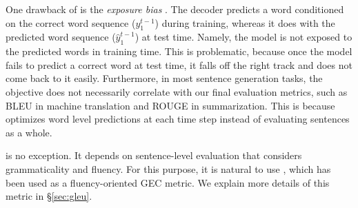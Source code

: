 One drawback of \mle is the {\em exposure bias} \cite{2015arXiv151106732R}. 
The decoder predicts a word conditioned on the correct word sequence ($y_{1}^{t-1}$) during training, whereas it does with the predicted word sequence ($\hat{y}_{1}^{t-1}$) at test time. 
Namely, the model is not exposed to the predicted words in training time.
This is problematic, because once the model fails to predict a correct word at test time, it falls off the right track and does not come back to it easily.
Furthermore, in most sentence generation tasks, the \mle objective does not necessarily correlate with our final evaluation metrics, such as BLEU \cite{papineni-EtAl:2002:ACL} in machine translation and ROUGE \cite{lin:2004:ACLsummarization} in summarization.
This is because \mle optimizes word level predictions at each time step instead of evaluating sentences as a whole.

\gec is no exception.
It depends on sentence-level evaluation that considers grammaticality and fluency.
For this purpose, it is natural to use \metric \cite{napoles-EtAl:2015:ACL-IJCNLP}, which has been used as a fluency-oriented GEC metric. 
We explain more details of this metric in \S\ref{sec:gleu}.


\vspace{-1mm}
